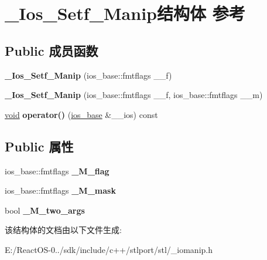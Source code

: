 \hypertarget{struct___ios___setf___manip}{}\section{\+\_\+\+Ios\+\_\+\+Setf\+\_\+\+Manip结构体 参考}
\label{struct___ios___setf___manip}
\subsection*{Public 成员函数}
\begin{DoxyCompactItemize}
\item 
\mbox{\label{struct___ios___setf___manip_ad897417ae609c3dfc279477336eff63c}} 
{\bfseries \+\_\+\+Ios\+\_\+\+Setf\+\_\+\+Manip} (ios\+\_\+base\+::fmtflags \+\_\+\+\_\+f)
\item 
\mbox{\label{struct___ios___setf___manip_a428e05da0a7bc61f7a06aab19343b649}} 
{\bfseries \+\_\+\+Ios\+\_\+\+Setf\+\_\+\+Manip} (ios\+\_\+base\+::fmtflags \+\_\+\+\_\+f, ios\+\_\+base\+::fmtflags \+\_\+\+\_\+m)
\item 
\mbox{\label{struct___ios___setf___manip_aad21a638194f1de663bf854b79a595df}} 
\hyperlink{interfacevoid}{void} {\bfseries operator()} (\hyperlink{classios__base}{ios\+\_\+base} \&\+\_\+\+\_\+ios) const
\end{DoxyCompactItemize}
\subsection*{Public 属性}
\begin{DoxyCompactItemize}
\item 
\mbox{\label{struct___ios___setf___manip_a9506712ab7edc760afb739df0b0d2d10}} 
ios\+\_\+base\+::fmtflags {\bfseries \+\_\+\+M\+\_\+flag}
\item 
\mbox{\label{struct___ios___setf___manip_ab0d104405740e8e546554447177d6171}} 
ios\+\_\+base\+::fmtflags {\bfseries \+\_\+\+M\+\_\+mask}
\item 
\mbox{\label{struct___ios___setf___manip_a79a3521951c872a83b6a6c821925a245}} 
bool {\bfseries \+\_\+\+M\+\_\+two\+\_\+args}
\end{DoxyCompactItemize}


该结构体的文档由以下文件生成\+:\begin{DoxyCompactItemize}
\item 
E\+:/\+React\+O\+S-\/0../sdk/include/c++/stlport/stl/\+\_\+iomanip.\+h\end{DoxyCompactItemize}

